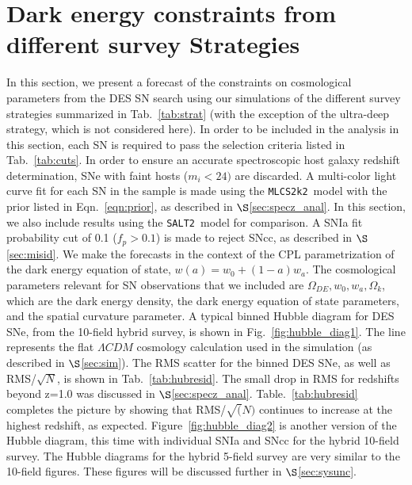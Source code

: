 \documentclass[preprint2]{aastex}    %
\newcommand{\mlcs}{{\tt MLCS2k2}}
\newcommand{\salt}{{\tt SALT2}}
\begin{document}
\section{Dark energy constraints from different survey Strategies}\label{sec:cosmo}
In this section, we present a forecast of the constraints on cosmological parameters from the 
DES SN search using our simulations of the different survey strategies summarized in 
Tab.~\ref{tab:strat} (with the exception of the ultra-deep strategy, which is not considered here). 
In order to be included in the analysis in this section, each SN is required to pass the selection
criteria listed in Tab.~\ref{tab:cuts}. In order to ensure an accurate spectroscopic host galaxy redshift
determination, SNe with faint hosts ($m_i<24)$ are discarded. A multi-color light curve fit for each SN
in the sample is made using the \mlcs\ model with the prior listed in Eqn.~\ref{eqn:prior}, 
as described in $\S$\ref{sec:specz_anal}. In this section, we also include results using the \salt\
model for comparison. A SNIa fit probability cut of 0.1 ($f_p>0.1$) is made to reject SNcc, as described in
$\S$\ref{sec:misid}. We make the forecasts in the context of the CPL parametrization 
\citep{che01,lin03} of the dark energy equation of state, $w(a) = w_0 + (1-a)w_a$.
The cosmological parameters relevant for SN observations that we included are 
$\Omega_{DE},w_0, w_a,\Omega_k$, which are the dark energy density, 
the dark energy equation of state parameters, and the spatial curvature parameter. 
A typical binned Hubble diagram for DES SNe, from the 10-field hybrid survey,  is shown 
in Fig.~\ref{fig:hubble_diag1}.  The line represents the flat $\Lambda CDM$ 
cosmology calculation used in the simulation (as described in $\S$\ref{sec:sim}).
The RMS scatter for the binned DES SNe, as well as RMS/$\sqrt{N}$, 
is shown in Tab.~\ref{tab:hubresid}. The small drop in RMS for 
redshifts beyond z=1.0 was discussed in $\S$\ref{sec:specz_anal}. Table.~\ref{tab:hubresid}
completes the picture by showing that RMS/$\sqrt(N)$ continues to increase at the highest
redshift, as expected.
Figure~\ref{fig:hubble_diag2} is another version of 
the Hubble diagram, this time with individual SNIa and SNcc for 
the hybrid 10-field survey.  The Hubble diagrams for the 
hybrid 5-field survey are very similar to the 10-field figures.
These figures 
will be discussed further in $\S$\ref{sec:sysunc}.
\end{document}
